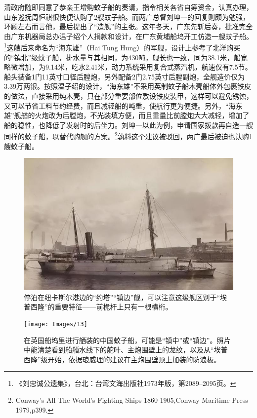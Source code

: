 \documentclass[12pt,UTF8]{ctexbook}
\begin{document}
清政府随即同意了恭亲王增购蚊子船的奏请，指令相关各省自筹资金，认真办理，山东巡抚周恒祺很快便认购了2艘蚊子船。而两广总督刘坤一的回复则颇为勉强，环顾左右而言他，最后提出了“造舰”的主张。这年冬天，广东先斩后奏，批准完全由广东机器局总办温子绍个人捐款和设计，在广东黄埔船坞开工仿造一艘蚊子船。\footnote{《刘忠诚公遗集》，台北：台湾文海出版社1973年版，第2089--2095页。}这艘后来命名为“海东雄”（Hai Tung Hung）的军舰，设计上参考了北洋购买的“镇北”级蚊子船，排水量与其相同，为430吨，舰长也一致，同为38.1米，船宽略微增加，为9.14米，吃水2.41米，动力系统采用复合式蒸汽机，航速仅有7.5节。船头装备1门11英寸口径后膛炮，另外配备2门2.75英寸后膛副炮，全舰造价仅为3.39万两银。按照温子绍的设计，“海东雄”不采用英制蚊子船木壳船体外包裹铁皮的做法，直接采用纯木壳，只在部分重要部位敷设铁皮装甲，这样可以避免锈蚀，又可以节省工料节约经费，而且减轻船的吨重，使航行更为便捷。另外，“海东雄”舰艏的火炮改为后膛炮，不光装填方便，而且重量比前膛炮大大减轻，增加了船的稳性，也降低了发射时的后坐力。刘坤一以此为例，申请国家拨款再自造一艘同样的蚊子船，以替代购舰的方案。\footnote{Conway's All The World's Fighting Ships 1860-1905,Conway Maritime Press 1979,p399.}孰料这个建议被驳回，两广最后被迫也认购1艘蚊子船。

\begin{figure}[htbp]
	\centering
	\includegraphics[width=1\linewidth]{Images/12}
	\caption{停泊在纽卡斯尔港边的“约塔”“镇边”舰，可以注意这级舰区别于“埃普西隆”的重要特征——前桅杆上只有一根横桁。}
	\label{fig:1}
\end{figure}

\begin{figure}[htbp]
	\centering
	\texttt{[image: Images/13]}
	\caption{在英国船坞里进行舾装的中国蚊子船，可能是“镇中”或“镇边”。照片中能清楚看到船艏水线下的舵叶、主炮围壁上的龙纹，以及从“埃普西隆”级开始，依据琅威理的建议在主炮围壁顶上加装的防浪板。}
	\label{fig:1}
\end{figure}
\end{document}
